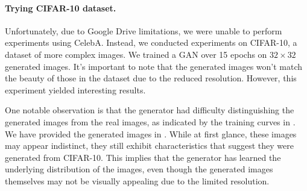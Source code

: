 \paragraph*{Trying CIFAR-10 dataset.}

Unfortunately, due to Google Drive limitations, we were unable to perform experiments using CelebA. Instead, we conducted experiments on CIFAR-10, a dataset of more complex images. We trained a GAN over 15 epochs on $32 \times 32$ generated images. It's important to note that the generated images won't match the beauty of those in the dataset due to the reduced resolution. However, this experiment yielded interesting results.

One notable observation is that the generator had difficulty distinguishing the generated images from the real images, as indicated by the training curves in . We have provided the generated images in . While at first glance, these images may appear indistinct, they still exhibit characteristics that suggest they were generated from CIFAR-10. This implies that the generator has learned the underlying distribution of the images, even though the generated images themselves may not be visually appealing due to the limited resolution.

